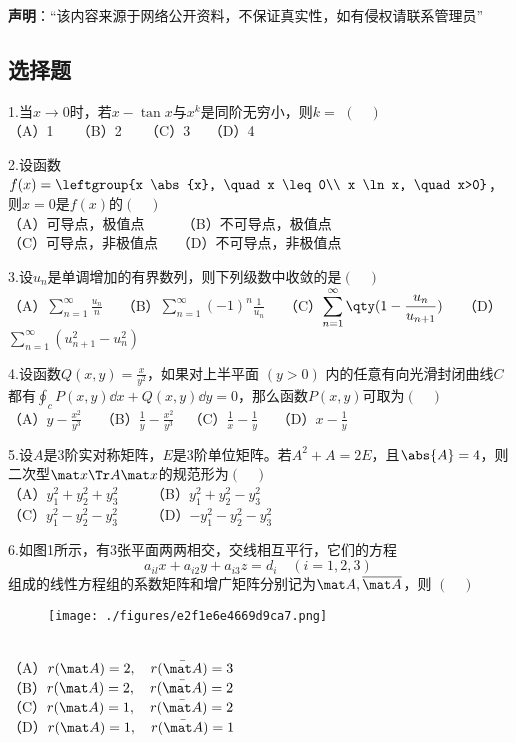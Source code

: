 

\textbf{声明}：“该内容来源于网络公开资料，不保证真实性，如有侵权请联系管理员”


\subsection{选择题}
1.当$x \to 0$时，若$x-\tan x$与$x^k$是同阶无穷小，则$k=$ $(\quad)$\\
（A）1 $\quad$ （B）2 $\quad$ （C）3  $\quad$（D）4 $\quad$

2.设函数$f(x)=\leftgroup{x \abs{x}, \quad x \leq 0\\ x \ln x, \quad x>0}$，则$x=0$是$f(x)$的$(\quad)$\\
（A）可导点，极值点 $ \qquad$ （B）不可导点，极值点 \\
（C）可导点，非极值点  $\quad$（D）不可导点，非极值点 

3.设${u_n}$是单调增加的有界数列，则下列级数中收敛的是$(\quad)$\\
（A）$\displaystyle \sum_{n=1}^\infty \frac{u_n}{n} \quad$ 
（B）$\displaystyle \sum_{n=1}^\infty (-1)^n \frac{1}{u_n} \quad$
（C）$\displaystyle \sum_{n=1}^\infty \qty (1- \frac{u_n}{u_{n+1}}) \quad$ 
（D）$\displaystyle \sum_{n=1}^\infty (u_{n+1}^2-u_n ^2)$

4.设函数$Q(x,y)=\frac{x}{y^2}$，如果对上半平面 $(y>0)$ 内的任意有向光滑封闭曲线$C$都有$\oint_c P(x,y)\dd{x}+Q(x,y)\dd{y}=0$，那么函数$P(x,y)$可取为$(\quad)$\\
（A）$ \displaystyle y-\frac{x^2}{y^3} \quad$ （B）$\displaystyle \frac{1}{y}-\frac{x^2}{y^3}\quad$（C）$ \displaystyle \frac{1}{x}-\frac{1}{y}\quad$ （D）$ \displaystyle x-\frac{1}{y}\quad$

5.设$A$是3阶实对称矩阵，$E$是3阶单位矩阵。若$A^2 + A=2E$，且$\abs{A}=4$，则二次型$\mat x\Tr A \mat x$的规范形为$(\quad)$\\
（A）$y_1 ^2+y_2 ^2 +y_3 ^2 \qquad$  （B）$y_1 ^2+y_2 ^2 -y_3 ^2$ \\ 
（C）$y_1 ^2-y_2 ^2 -y_3 ^2 \qquad$  （D）$-y_1 ^2-y_2 ^2 -y_3 ^2$


6.如图1所示，有3张平面两两相交，交线相互平行，它们的方程$$a_{il}x + a_{i2}y + a_{i3}z = d_i \quad (i=1,2,3)~$$组成的线性方程组的系数矩阵和增广矩阵分别记为$\mat A , \overline{ \mat A} $，则 $(\quad)$
\begin{figure}[ht]
\centering
\texttt{[image: ./figures/e2f1e6e4669d9ca7.png]}
\caption{} \label{fig_PeeM19_1}
\end{figure}\\
（A）$r(\mat A)=2,\quad r(\bar{\mat A})=3 \qquad$ \\
（B）$r(\mat A)=2,\quad r(\bar{\mat A})=2 \qquad$\\
（C）$r(\mat A)=1,\quad r(\bar{\mat A})=2 \qquad$ \\
（D）$r(\mat A)=1,\quad r(\bar{\mat A})=1 \qquad$ 

